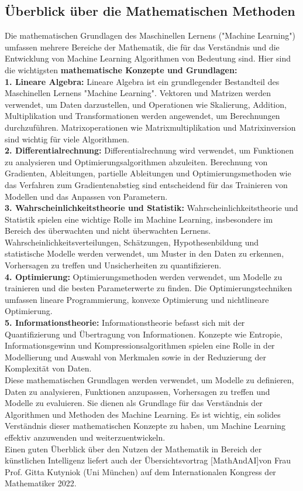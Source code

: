 \documentclass[12pt]{article}
\begin{document}
\subsection{Überblick über die Mathematischen Methoden}
Die mathematischen Grundlagen des Maschinellen Lernens ("Machine Learning") umfassen mehrere Bereiche der Mathematik, die für das Verständnis und die Entwicklung von Machine Learning Algorithmen von Bedeutung sind.
Hier sind die wichtigsten \textbf{mathematische Konzepte und Grundlagen:}\\[0.3cm]
%
\textbf{1. Lineare Algebra:} Lineare Algebra ist ein grundlegender Bestandteil des Maschinellen Lernens "Machine Learning". Vektoren und Matrizen werden verwendet, um Daten darzustellen, und Operationen wie Skalierung, Addition, Multiplikation und Transformationen werden angewendet, um Berechnungen durchzuführen. Matrixoperationen wie Matrixmultiplikation und Matrixinversion sind wichtig für viele Algorithmen.\\[0.2cm]
%
\textbf{2. Differentialrechnung:} Differentialrechnung wird verwendet, um Funktionen zu analysieren und Optimierungsalgorithmen abzuleiten. Berechnung von Gradienten, Ableitungen, partielle Ableitungen und Optimierungsmethoden wie das Verfahren zum Gradientenabstieg  sind entscheidend für das Trainieren von Modellen und das Anpassen von Parametern.\\[0.2cm]
%
\textbf{3. Wahrscheinlichkeitstheorie und Statistik:} Wahrscheinlichkeitstheorie und Statistik spielen eine wichtige Rolle im Machine Learning, insbesondere im Bereich des überwachten und nicht überwachten Lernens. Wahrscheinlichkeitsverteilungen, Schätzungen, Hypothesenbildung und statistische Modelle werden verwendet, um Muster in den Daten zu erkennen, Vorhersagen zu treffen und Unsicherheiten zu quantifizieren.\\[0.2cm]
%
\textbf{4. Optimierung:} Optimierungsmethoden werden verwendet, um Modelle zu trainieren und die besten Parameterwerte zu finden. Die Optimierungstechniken umfassen lineare Programmierung, konvexe Optimierung und nichtlineare Optimierung.\\[0.2cm]
%
\textbf{5. Informationstheorie:} Informationstheorie befasst sich mit der Quantifizierung und Übertragung von Informationen. Konzepte wie Entropie, Informationsgewinn und Kompressionsalgorithmen spielen eine Rolle in der Modellierung und Auswahl von Merkmalen sowie in der Reduzierung der Komplexität von Daten.\\[0.2cm]
%
Diese mathematischen Grundlagen werden verwendet, um Modelle zu definieren, Daten zu analysieren, Funktionen anzupassen, Vorhersagen zu treffen und Modelle zu evaluieren. Sie dienen als Grundlage für das Verständnis der Algorithmen und Methoden des Machine Learning. Es ist wichtig, ein solides Verständnis dieser mathematischen Konzepte zu haben, um Machine Learning effektiv anzuwenden und weiterzuentwickeln.\\
Einen guten Überblick über den Nutzen der Mathematik in Bereich der künstlichen Intelligenz liefert auch der Übersichtsvortrag [MathAndAI]von Frau Prof. Gitta Kutyniok (Uni München) auf dem Internationalen Kongress der Mathematiker 2022.\\[0.2cm]  
% 
%
\end{document}
